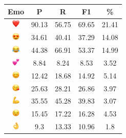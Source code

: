 \documentclass{article}
\begin{document}
\begin{table}
\centering
\begin{tabular}{|c|ccc|c|} \hline
\textbf{Emo} & \textbf{P} & \textbf{R} & \textbf{F1} & \textbf{\%} \\ \hline
\includegraphics[height=0.37cm,width=0.37cm]{img/red_heart.png} & 90.13 & 56.75 & 69.65 & 21.41\\ 
\includegraphics[height=0.37cm,width=0.37cm]{img/smiling_face_with_hearteyes.png} & 34.61 & 40.41 & 37.29 & 14.08\\ 
\includegraphics[height=0.37cm,width=0.37cm]{img/face_with_tears_of_joy.png} & 44.38 & 66.91 & 53.37 & 14.99\\ 
\includegraphics[height=0.37cm,width=0.37cm]{img/two_hearts.png} & 8.84 & 8.24 & 8.53 & 3.52\\ 
\includegraphics[height=0.37cm,width=0.37cm]{img/smiling_face_with_smiling_eyes.png} & 12.42 & 18.68 & 14.92 & 5.14\\ 
\includegraphics[height=0.37cm,width=0.37cm]{img/face_blowing_a_kiss.png} & 25.63 & 28.21 & 26.86 & 3.97\\ 
\includegraphics[height=0.37cm,width=0.37cm]{img/flexed_biceps.png} & 35.55 & 45.28 & 39.83 & 3.07\\ 
\includegraphics[height=0.37cm,width=0.37cm]{img/winking_face.png} & 15.45 & 17.22 & 16.28 & 4.53\\ 
\includegraphics[height=0.37cm,width=0.37cm]{img/OK_hand.png} & 9.3 & 13.33 & 10.96 & 1.8\\ 

\end{tabular}
\end{table}
\end{document}
